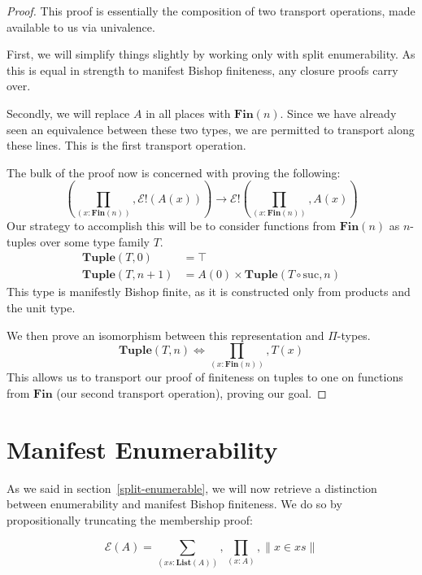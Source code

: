 \begin{proof}
  This proof is essentially the composition of two transport operations, made
  available to us via univalence.
  
  First, we will simplify things slightly by working only with split
  enumerability.
  As this is equal in strength to manifest Bishop finiteness, any closure proofs
  carry over.

  Secondly, we will replace \(A\) in all places with \(\mathbf{Fin}(n)\).
  Since we have already seen an equivalence between these two types, we are
  permitted to transport along these lines.
  This is the first transport operation.

  The bulk of the proof now is concerned with proving the following:
  \begin{equation}
    \left( \prod_{(x : \mathbf{Fin}(n))} , \mathcal{E}!(A(x)) \right) \rightarrow \mathcal{E}!\left( \prod_{(x : \mathbf{Fin}(n))} , A(x) \right)
  \end{equation}
  Our strategy to accomplish this will be to consider functions from
  \(\mathbf{Fin}(n)\) as \(n\)-tuples over some type family \(T\).
  \begin{equation}
    \begin{aligned}
      \mathbf{Tuple}(T, 0)   &= \top \\
      \mathbf{Tuple}(T, n+1) &= A(0) \times \mathbf{Tuple}(T \circ \text{suc}, n)
    \end{aligned}
  \end{equation}
  This type is manifestly Bishop finite, as it is constructed only from products
  and the unit type.
  
  We then prove an isomorphism between this representation and \(\Pi\)-types.
  \begin{equation}
    \mathbf{Tuple}(T, n) \iff \prod_{(x : \mathbf{Fin}(n))} , T(x)
  \end{equation}
  This allows us to transport our proof of finiteness on tuples to one on
  functions from \(\mathbf{Fin}\) (our second transport operation), proving our
  goal.
  
\end{proof}
\section{Manifest Enumerability} \label{manifest-enumerability}
As we said in section~\ref{split-enumerable}, we will now retrieve a distinction
between enumerability and manifest Bishop finiteness.
We do so by propositionally truncating the membership proof:
\begin{rm-definition}
  \begin{equation}
    \mathcal{E}(A) = \sum_{(\mathit{xs} : \mathbf{List}(A))} , \prod_{(x : A)} , \lVert x \in \mathit{xs} \rVert
  \end{equation}
\end{rm-definition}
